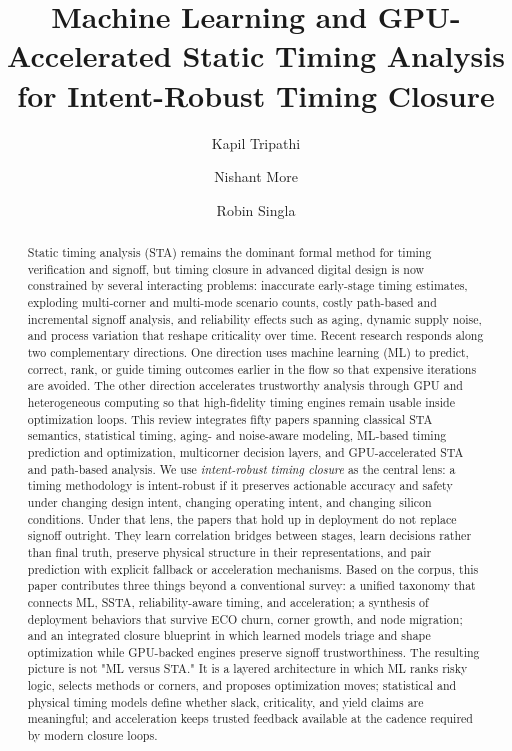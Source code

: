 \documentclass[num-refs]{wiley-article}
\title{Machine Learning and GPU-Accelerated Static Timing Analysis for Intent-Robust Timing Closure}
\author[1]{Kapil Tripathi}
\author[1]{Nishant More}
\author[1]{Robin Singla}
\affil[1]{Department of Electronics and Communication Engineering, Thapar Institute of Engineering and Technology, Patiala, India}
\begin{document}
    \begin{frontmatter}
    \maketitle

    \begin{abstract}
    Static timing analysis (STA) remains the dominant formal method for timing verification and signoff, but timing closure in advanced digital design is now constrained by several interacting problems: inaccurate early-stage timing estimates, exploding multi-corner and multi-mode scenario counts, costly path-based and incremental signoff analysis, and reliability effects such as aging, dynamic supply noise, and process variation that reshape criticality over time. Recent research responds along two complementary directions. One direction uses machine learning (ML) to predict, correct, rank, or guide timing outcomes earlier in the flow so that expensive iterations are avoided. The other direction accelerates trustworthy analysis through GPU and heterogeneous computing so that high-fidelity timing engines remain usable inside optimization loops. This review integrates fifty papers spanning classical STA semantics, statistical timing, aging- and noise-aware modeling, ML-based timing prediction and optimization, multicorner decision layers, and GPU-accelerated STA and path-based analysis. We use \emph{intent-robust timing closure} as the central lens: a timing methodology is intent-robust if it preserves actionable accuracy and safety under changing design intent, changing operating intent, and changing silicon conditions. Under that lens, the papers that hold up in deployment do not replace signoff outright. They learn correlation bridges between stages, learn decisions rather than final truth, preserve physical structure in their representations, and pair prediction with explicit fallback or acceleration mechanisms. Based on the corpus, this paper contributes three things beyond a conventional survey: a unified taxonomy that connects ML, SSTA, reliability-aware timing, and acceleration; a synthesis of deployment behaviors that survive ECO churn, corner growth, and node migration; and an integrated closure blueprint in which learned models triage and shape optimization while GPU-backed engines preserve signoff trustworthiness. The resulting picture is not "ML versus STA." It is a layered architecture in which ML ranks risky logic, selects methods or corners, and proposes optimization moves; statistical and physical timing models define whether slack, criticality, and yield claims are meaningful; and acceleration keeps trusted feedback available at the cadence required by modern closure loops.

    \end{abstract}
    \end{frontmatter}
\end{document}
